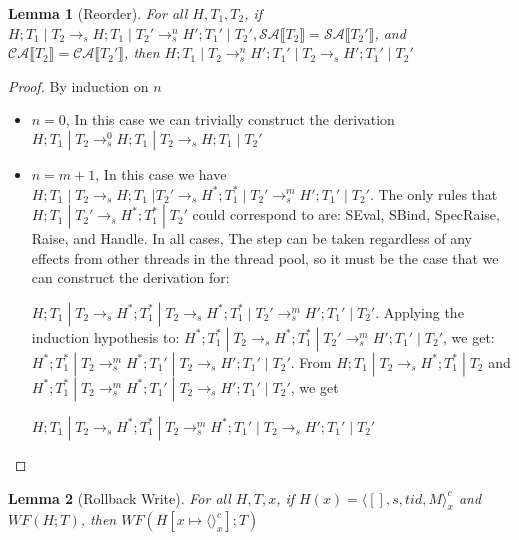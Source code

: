 \documentclass[9pt]{article}
\newtheorem{lemma}{Lemma}
\newcommand\specStep{\rightarrow_{s}}
\newcommand{\specActions}[1]{\mathcal{SA} \llbracket #1 \rrbracket}
\newcommand{\commitActions}[1]{\mathcal{CA} \llbracket #1 \rrbracket}
\begin{document}
\begin{lemma}[Reorder]
\label{reorderLemma}
For all $H, T_1, T_2$, if $H; T_1 \; | \; T_2 \specStep H; T_1 \; | \; T_2' \specStep^n H'; T_1' \; | \; T_2', \specActions{T_2} = \specActions{T_2'}$, and $\commitActions{T_2} = \commitActions{T_2'}$, then $H; T_1 \; | \; T_2 \specStep^n H'; T_1' \; | \; T_2 \specStep H'; T_1' \; | \; T_2'$

\end{lemma}

\begin{proof}

By induction on $n$

\begin{itemize}
\item $n = 0$, In this case we can trivially construct the derivation $H; T_1 \; | \; T_2 \specStep^0 H; T_1 \; | \; T_2 \specStep H; T_1 \; | \; T_2'$

\item $n = m+1$, In this case we have $H; T_1 \; | \; T_2 \specStep H; T_1 \; | T_2' \specStep H^*; T_1^* \; | \; T_2' \specStep^m H'; T_1' \; | \; T_2'$.  The only rules that $H; T_1 \; | \; T_2' \specStep H^*; T_1^* \; | \; T_2'$ could correspond to are: SEval, SBind, SpecRaise, Raise, and Handle.  In all cases, The step can be taken regardless of any effects from other threads in the thread pool, so it must be the case that we can construct the derivation for:

$H; T_1 \; | \; T_2 \specStep H^*; T_1^* \; | \; T_2 \specStep H^*; T_1^* \; | \; T_2' \specStep^m H'; T_1' \; | \; T_2'$.  Applying the induction hypothesis to: $H^*; T_1^* \; | \; T_2 \specStep H^*; T_1^* \; | \; T_2' \specStep^m H'; T_1' \; | \; T_2'$, we get: $H^*; T_1^* \; | \; T_2 \specStep^m H^*; T_1' \; | \; T_2 \specStep H'; T_1' \; | \; T_2'$.  From 
$H; T_1 \; | \; T_2 \specStep H^*; T_1^* \; | \; T_2$ and $H^*; T_1^* \; | \; T_2 \specStep^m H^*; T_1' \; | \; T_2 \specStep H'; T_1' \; | \; T_2'$, we get

$H; T_1\; | \; T_2 \specStep H^*; T_1^* \; | \; T_2 \specStep^m H^*; T_1' \; | \; T_2 \specStep H'; T_1' \; | \; T_2'$
\end{itemize}

\end{proof}

\begin{lemma}[Rollback Write]
\label{rollbackWrite}
For all $H, T, x$, if $H(x) = \langle [], s, tid, M\rangle_x^c$ and $WF(H; T)$, then $WF(H[x \mapsto \langle\rangle_x^c]; T)$
\end{lemma}
\end{document}
